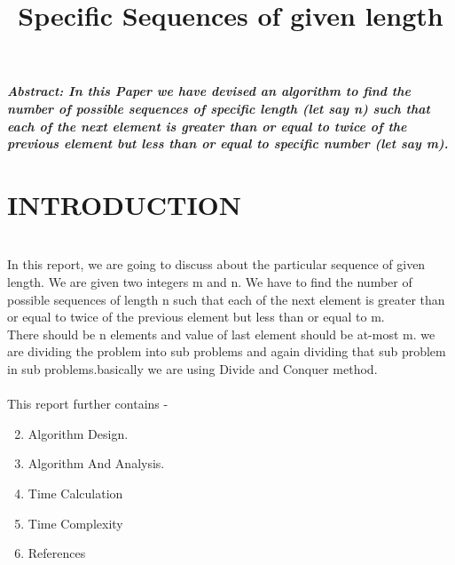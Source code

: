 \documentclass[conference]{IEEEtran}
\begin{document}
\title{Specific Sequences of given length  \\
}
\author{
\and
{}
\and
{}
}

\maketitle
{\textbf{\textit{Abstract: In this Paper we have devised an algorithm to find the number of possible sequences of specific length (let say n) such that each of the next element is greater than or equal to twice of the previous element but less than or equal to specific number (let say m).\\ 
}}}
\maketitle

\section{INTRODUCTION}\\
In this report, we are going to discuss about the particular sequence of given length. We are given two integers m and n.
We have to find the number of possible sequences of length n such that each of the next element is greater than or equal to twice of the previous element but less than or equal to m.\\
There should be n elements and value of last element should be at-most m. 
we are dividing the problem into sub problems and again dividing that sub problem in sub problems.basically we are using Divide and Conquer method.\\
\\ This report further contains - 
\renewcommand{\labelenumi}{\Roman{enumi}}
\begin{enumerate}
\setcounter{enumi}{1}
    \item Algorithm Design.
    \item Algorithm And  Analysis.
    \item Time Calculation
    \item Time Complexity
    \item References\\
\end{enumerate}
\end{document}
